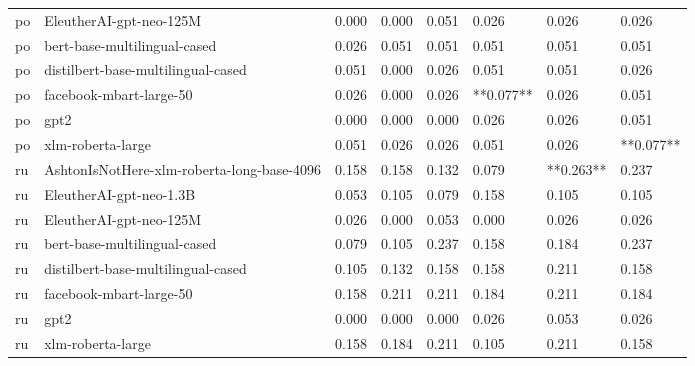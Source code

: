\begin{tabular}{llllllll}
      po &                    EleutherAI-gpt-neo-125M & 0.000 &                     0.000 &                 0.051 &                  0.026 &                                   0.026 &     0.026 \\
      po &               bert-base-multilingual-cased & 0.026 &                     0.051 &                 0.051 &                  0.051 &                                   0.051 &     0.051 \\
      po &         distilbert-base-multilingual-cased & 0.051 &                     0.000 &                 0.026 &                  0.051 &                                   0.051 &     0.026 \\
      po &                    facebook-mbart-large-50 & 0.026 &                     0.000 &                 0.026 &              **0.077** &                                   0.026 &     0.051 \\
      po &                                       gpt2 & 0.000 &                     0.000 &                 0.000 &                  0.026 &                                   0.026 &     0.051 \\
      po &                          xlm-roberta-large & 0.051 &                     0.026 &                 0.026 &                  0.051 &                                   0.026 & **0.077** \\
      ru & AshtonIsNotHere-xlm-roberta-long-base-4096 & 0.158 &                     0.158 &                 0.132 &                  0.079 &                               **0.263** &     0.237 \\
      ru &                    EleutherAI-gpt-neo-1.3B & 0.053 &                     0.105 &                 0.079 &                  0.158 &                                   0.105 &     0.105 \\
      ru &                    EleutherAI-gpt-neo-125M & 0.026 &                     0.000 &                 0.053 &                  0.000 &                                   0.026 &     0.026 \\
      ru &               bert-base-multilingual-cased & 0.079 &                     0.105 &                 0.237 &                  0.158 &                                   0.184 &     0.237 \\
      ru &         distilbert-base-multilingual-cased & 0.105 &                     0.132 &                 0.158 &                  0.158 &                                   0.211 &     0.158 \\
      ru &                    facebook-mbart-large-50 & 0.158 &                     0.211 &                 0.211 &                  0.184 &                                   0.211 &     0.184 \\
      ru &                                       gpt2 & 0.000 &                     0.000 &                 0.000 &                  0.026 &                                   0.053 &     0.026 \\
      ru &                          xlm-roberta-large & 0.158 &                     0.184 &                 0.211 &                  0.105 &                                   0.211 &     0.158 \\
\bottomrule
\end{tabular}
